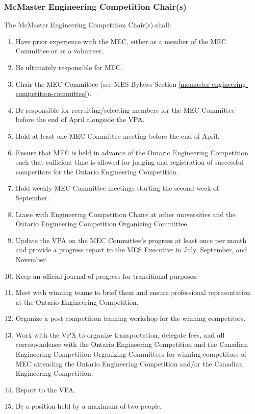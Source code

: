
\subsubsection{McMaster Engineering Competition Chair(s)}
\label{mcmaster-engineering-competition-chairs}
The McMaster Engineering Competition Chair(s) shall:

\begin{enumerate}
 \item
  Have prior experience with the MEC, either as a member of the MEC Committee or as a volunteer.
 \item
  Be ultimately responsible for MEC.
 \item
  Chair the MEC Committee (see MES Bylaws Section \ref{mcmaster-engineering-competition-committee}).
 \item
  Be responsible for recruiting/selecting members for the MEC Committee before the end of April alongside the VPA.
 \item
  Hold at least one MEC Committee meeting before the end of April.
 \item
  Ensure that MEC is held in advance of the Ontario Engineering Competition such that sufficient time is allowed for judging and registration of successful competitors for the Ontario Engineering Competition.
 \item
  Hold weekly MEC Committee meetings starting the second week of September.
 \item
  Liaise with Engineering Competition Chairs at other universities and the Ontario Engineering Competition Organizing Committee.
 \item
  Update the VPA on the MEC Committee's progress at least once per month and provide a progress report to the MES Executive in July, September, and November.
 \item
  Keep an official journal of progress for transitional purposes.
 \item
  Meet with winning teams to brief them and ensure professional representation at the Ontario Engineering Competition.
 \item
  Organize a post competition training workshop for the winning competitors.
 \item
  Work with the VPX to organize transportation, delegate fees, and all correspondence with the Ontario Engineering Competition and the Canadian Engineering Competition Organizing Committees for winning competitors of MEC attending the Ontario Engineering Competition and/or the Canadian Engineering Competition.
 \item
  Report to the VPA.
 \item
  Be a position held by a maximum of two people.

\end{enumerate}